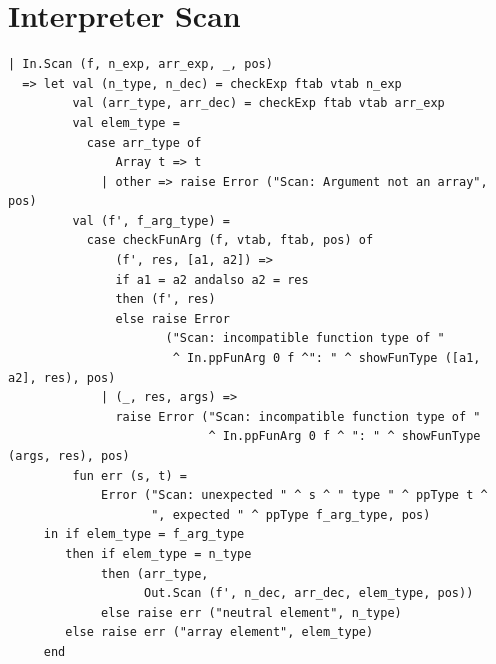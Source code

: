 \documentclass[11pt]{article}
\begin{document}
    \section{Interpreter Scan} \label{interpreter_scan}
    \begin{lstlisting}
| In.Scan (f, n_exp, arr_exp, _, pos)
  => let val (n_type, n_dec) = checkExp ftab vtab n_exp
         val (arr_type, arr_dec) = checkExp ftab vtab arr_exp
         val elem_type =
           case arr_type of
               Array t => t
             | other => raise Error ("Scan: Argument not an array", pos)
         val (f', f_arg_type) =
           case checkFunArg (f, vtab, ftab, pos) of
               (f', res, [a1, a2]) =>
               if a1 = a2 andalso a2 = res
               then (f', res)
               else raise Error
                      ("Scan: incompatible function type of "
                       ^ In.ppFunArg 0 f ^": " ^ showFunType ([a1, a2], res), pos)
             | (_, res, args) =>
               raise Error ("Scan: incompatible function type of "
                            ^ In.ppFunArg 0 f ^ ": " ^ showFunType (args, res), pos)
         fun err (s, t) =
             Error ("Scan: unexpected " ^ s ^ " type " ^ ppType t ^
                    ", expected " ^ ppType f_arg_type, pos)
     in if elem_type = f_arg_type
        then if elem_type = n_type
             then (arr_type,
                   Out.Scan (f', n_dec, arr_dec, elem_type, pos))
             else raise err ("neutral element", n_type)
        else raise err ("array element", elem_type)
     end
    \end{lstlisting}

    \newpage
\end{document}

